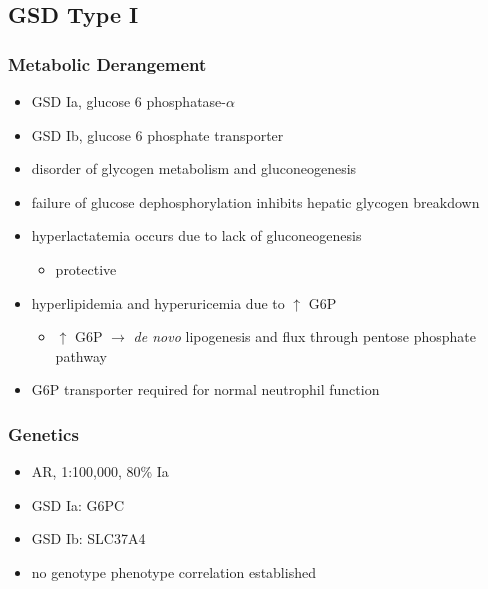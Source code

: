 \documentclass{scrartcl}
\begin{document}
\subsection{GSD Type I}
\label{sec:org5acc851}
\subsubsection{Metabolic Derangement}
\label{sec:org7b81e5b}
\begin{itemize}
\item GSD Ia, glucose 6 phosphatase-\(\alpha\)
\item GSD Ib, glucose 6 phosphate transporter
\item disorder of glycogen metabolism and gluconeogenesis
\item failure of glucose dephosphorylation inhibits hepatic glycogen breakdown
\item hyperlactatemia occurs due to lack of gluconeogenesis
\begin{itemize}
\item protective
\end{itemize}
\item hyperlipidemia and hyperuricemia due to \(\uparrow\) G6P
\begin{itemize}
\item \(\uparrow\) G6P \(\to\) \emph{de novo} lipogenesis and flux through pentose phosphate pathway
\end{itemize}
\item G6P transporter required for normal neutrophil function
\end{itemize}

\subsubsection{Genetics}
\label{sec:org4db409e}
\begin{itemize}
\item AR, 1:100,000, 80\% Ia
\item GSD Ia: G6PC
\item GSD Ib: SLC37A4
\item no genotype phenotype correlation established
\end{itemize}
\end{document}
